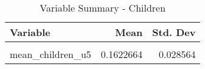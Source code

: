 \begin{table}[H]

\caption{\label{tab:tab:children}Variable Summary - Children}
\centering
\begin{tabular}[t]{lrr}
\toprule
Variable & Mean & Std. Dev\\
\midrule
\cellcolor{gray!6}{mean\_children} & \cellcolor{gray!6}{0.8006732} & \cellcolor{gray!6}{0.102887}\\
mean\_children\_u5 & 0.1622664 & 0.028564\\
\bottomrule
\end{tabular}
\end{table}

